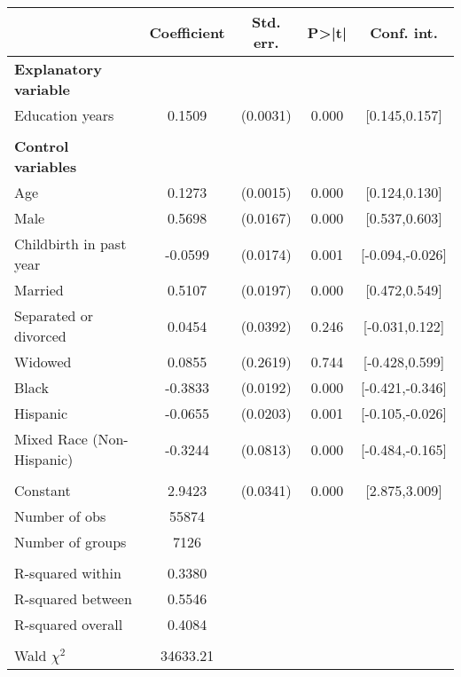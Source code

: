 {
\def\sym#1{\ifmmode^{#1}\else\(^{#1}\)\fi}
\begin{tabular}{l*{1}{cccc}}
\toprule
                    & Coefficient&   Std. err.&       P>|t|&  Conf. int.\\
\midrule
\textbf{Explanatory variable}&            &            &            &            \\
Education years     &      0.1509&    (0.0031)&       0.000&[0.145,0.157]\\
\\ \textbf{Control variables}&            &            &            &            \\
Age                 &      0.1273&    (0.0015)&       0.000&[0.124,0.130]\\
Male                &      0.5698&    (0.0167)&       0.000&[0.537,0.603]\\
Childbirth in past year&     -0.0599&    (0.0174)&       0.001&[-0.094,-0.026]\\
Married             &      0.5107&    (0.0197)&       0.000&[0.472,0.549]\\
Separated or divorced&      0.0454&    (0.0392)&       0.246&[-0.031,0.122]\\
Widowed             &      0.0855&    (0.2619)&       0.744&[-0.428,0.599]\\
Black               &     -0.3833&    (0.0192)&       0.000&[-0.421,-0.346]\\
Hispanic            &     -0.0655&    (0.0203)&       0.001&[-0.105,-0.026]\\
Mixed Race (Non-Hispanic)&     -0.3244&    (0.0813)&       0.000&[-0.484,-0.165]\\
                    &            &            &            &            \\
Constant            &      2.9423&    (0.0341)&       0.000&[2.875,3.009]\\
\midrule
Number of obs       &       55874&            &            &            \\
Number of groups    &        7126&            &            &            \\
\\ R-squared within &      0.3380&            &            &            \\
R-squared between   &      0.5546&            &            &            \\
R-squared overall   &      0.4084&            &            &            \\
\\ Wald $\chi^2$    &    34633.21&            &            &            \\

\end{tabular}}
